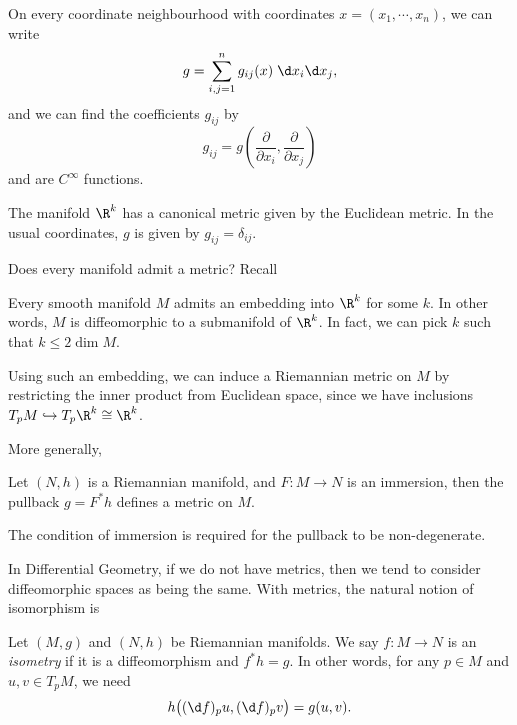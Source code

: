 \documentclass[a4paper]{article}
\begin{document}
On every coordinate neighbourhood with coordinates $x = (x_1, \cdots, x_n)$, we can write
\[
  g = \sum_{i, j = 1}^n g_{ij}(x)\;\d x_i \d x_j,
\]
and we can find the coefficients $g_{ij}$ by
\[
  g_{ij} = g\left(\frac{\partial}{\partial x_i}, \frac{\partial}{\partial x_j}\right)
\]
and are $C^\infty$ functions.

\begin{eg}
  The manifold $\R^k$ has a canonical metric given by the Euclidean metric. In the usual coordinates, $g$ is given by $g_{ij} = \delta_{ij}$.
\end{eg}

Does every manifold admit a metric? Recall

\begin{thm}
  Every smooth manifold $M$ admits an embedding into $\R^k$ for some $k$. In other words, $M$ is diffeomorphic to a submanifold of $\R^k$. In fact, we can pick $k$ such that $k \leq 2 \dim M$.
\end{thm}

Using such an embedding, we can induce a Riemannian metric on $M$ by restricting the inner product from Euclidean space, since we have inclusions $T_pM \hookrightarrow T_p \R^k \cong \R^k$.

More generally,
\begin{lemma}
  Let $(N, h)$ is a Riemannian manifold, and $F: M \to N$ is an immersion, then the pullback $g = F^*h$ defines a metric on $M$.
\end{lemma}
The condition of immersion is required for the pullback to be non-degenerate.

In Differential Geometry, if we do not have metrics, then we tend to consider diffeomorphic spaces as being the same. With metrics, the natural notion of isomorphism is
\begin{defi}[Isometry]
  Let $(M, g)$ and $(N, h)$ be Riemannian manifolds. We say $f: M \to N$ is an \emph{isometry} if it is a diffeomorphism and $f^*h = g$. In other words, for any $p \in M$ and $u, v \in T_p M$, we need
  \[
    h\big((\d f)_p u, (\d f)_p v\big) = g(u, v).
  \]
\end{defi}
\end{document}
